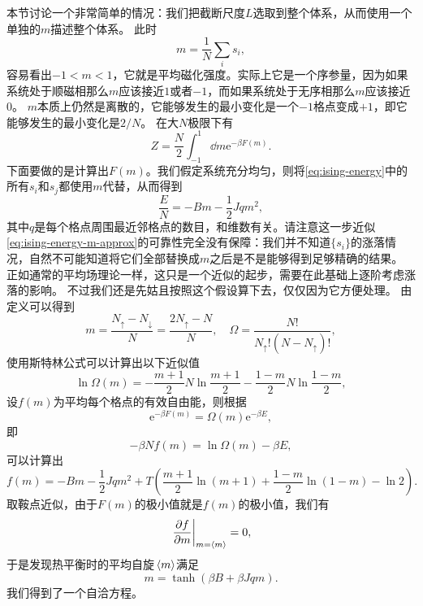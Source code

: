 \documentclass[hyperref, UTF8, a4paper]{ctexart}
\newcommand*{\ee}{\mathrm{e}}
\begin{document}
本节讨论一个非常简单的情况：我们把截断尺度$L$选取到整个体系，从而使用一个单独的$m$描述整个体系。
此时
\begin{equation}
    m = \frac{1}{N} \sum_i s_i,
\end{equation}
容易看出$-1 < m < 1$，它就是平均磁化强度。实际上它是一个序参量，因为如果系统处于顺磁相那么$m$应该接近$1$或者$-1$，而如果系统处于无序相那么$m$应该接近$0$。
$m$本质上仍然是离散的，它能够发生的最小变化是一个$-1$格点变成$+1$，即它能够发生的最小变化是$2/N$。
在大$N$极限下有
\begin{equation}
    Z = \frac{N}{2} \int_{-1}^1 \dd{m} \ee^{-\beta F(m)}.
\end{equation}
下面要做的是计算出$F(m)$。我们假定系统充分均匀，则将\eqref{eq:ising-energy}中的所有$s_i$和$s_j$都使用$m$代替，从而得到
\begin{equation}
    \frac{E}{N} = - B m - \frac{1}{2} J q m^2,
    \label{eq:ising-energy-m-approx}
\end{equation}
其中$q$是每个格点周围最近邻格点的数目，和维数有关。请注意这一步近似\eqref{eq:ising-energy-m-approx}的可靠性完全没有保障：我们并不知道$\{s_i\}$的涨落情况，自然不可能知道将它们全部替换成$m$之后是不是能够得到足够精确的结果。
正如通常的平均场理论一样，这只是一个近似的起步，需要在此基础上逐阶考虑涨落的影响。
不过我们还是先姑且按照这个假设算下去，仅仅因为它方便处理。
由定义可以得到
\[
    m = \frac{N_\uparrow - N_\downarrow}{N} = \frac{2N_\uparrow - N}{N}, \quad \Omega = \frac{N!}{N_\uparrow!(N-N_\uparrow)!},
\]
使用斯特林公式可以计算出以下近似值
\begin{equation}
    \ln\Omega(m) = - \frac{m+1}{2} N \ln\frac{m+1}{2} - \frac{1-m}{2} N \ln\frac{1-m}{2},
    \label{eq:lattice-entropy}
\end{equation}
设$f(m)$为平均每个格点的有效自由能，则根据
\[
    \ee^{-\beta F(m)} = \Omega(m) \ee^{-\beta E},
\]
即
\[
    -\beta N f(m) = \ln \Omega(m) - \beta E,
\]
可以计算出
\begin{equation}
    f(m) = - Bm - \frac{1}{2} J q m^2 + T \left( \frac{m+1}{2} \ln(m+1) + \frac{1-m}{2} \ln(1-m) - \ln 2 \right).
    \label{eq:free-energy-of-m}
\end{equation}
取鞍点近似，由于$F(m)$的极小值就是$f(m)$的极小值，我们有
\[
    \eval{\pdv{f}{m}}_{m=\expval*{m}} = 0,
\]
于是发现热平衡时的平均自旋$\expval*{m}$满足
\begin{equation}
    m = \tanh(\beta B + \beta J q m).
    \label{eq:self-consistency-m-approx}
\end{equation}
我们得到了一个自洽方程。
\end{document}
